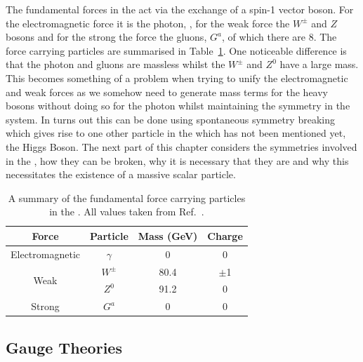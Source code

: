 The fundamental forces in the \SM act via the exchange of a spin-1 vector boson. For the electromagnetic force it is the photon, \gamma, for the weak force the $W^{\pm}$ and $Z$ bosons and for the strong the force the gluons, $G^{a}$, of which there are 8. The force carrying particles are summarised in Table~\ref{tab:forces}. One noticeable difference is that the photon and gluons are massless whilst the $W^{\pm}$ and $Z^{0}$ have a large mass. This becomes something of a problem when trying to unify the electromagnetic and weak forces as we somehow need to generate mass terms for the heavy bosons without doing so for the photon whilst maintaining the symmetry in the system. In turns out this can be done using spontaneous symmetry breaking which gives rise to one other particle in the \SM which has not been mentioned yet, the Higgs Boson. The next part of this chapter considers the symmetries involved in the \SM, how they can be broken, why it is necessary that they are and why this necessitates the existence of a massive scalar particle.

\begin{table}
  \begin{tabular}{c | c c c}
  Force & Particle & Mass (GeV) & Charge \\
  \hline
  Electromagnetic & $\gamma$ & 0 & 0 \\
  \multirow{2}{*}{Weak} & $W^{\pm}$ & 80.4 & $\pm$1 \\
                        & $Z^{0}$   & 91.2 & 0 \\
  Strong                & $G^{a}$   & 0 & 0 \\   
  \end{tabular}
  \caption{A summary of the fundamental force carrying particles in the \SM. All values taken from Ref.~\cite{pdg}.}
  \label{tab:forces}
\end{table}

\subsection{Gauge Theories}

